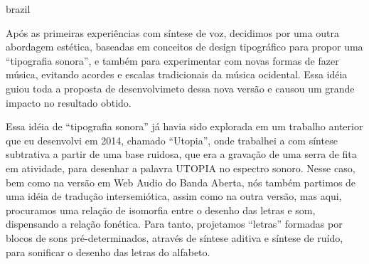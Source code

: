 \begin{otherlanguage*}{brazil}

Após as primeiras experiências com síntese de voz, decidimos por uma outra abordagem estética, baseadas em conceitos de design tipográfico \cite{ruder_typography:_2009} para propor uma ``tipografia sonora'', e também para experimentar com novas formas de fazer música, evitando acordes e escalas tradicionais da música ocidental. Essa idéia guiou toda a proposta de desenvolvimeto dessa nova versão e causou um grande impacto no resultado obtido.

Essa idéia de ``tipografia sonora'' já havia sido explorada em um trabalho anterior que eu desenvolvi em 2014, chamado ``Utopia'', onde trabalhei a com síntese subtrativa a partir de uma base ruidosa, que era a gravação de uma serra de fita em atividade, para desenhar a palavra UTOPIA no espectro sonoro. Nesse caso, bem como na versão em Web Audio do Banda Aberta, nós também partimos de uma idéia de tradução intersemiótica, assim como na outra versão, mas aqui, procuramos uma relação de isomorfia entre o desenho das letras e som, dispensando a relação fonética. Para tanto, projetamos ``letras'' formadas por blocos de sons pré-determinados, através de síntese aditiva e síntese de ruído, para sonificar o desenho das letras do alfabeto.





\end{otherlanguage*}
